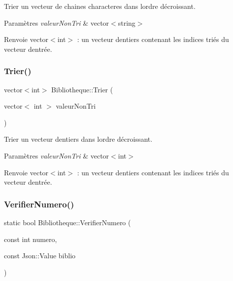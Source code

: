 Trier un vecteur de chaines characteres dans l\textquotesingle{}ordre décroissant. 


\begin{DoxyParams}{Paramètres}
{\em valeur\+Non\+Tri} & vector$<$string$>$ \\
\hline
\end{DoxyParams}
\begin{DoxyReturn}{Renvoie}
vector$<$int$>$ \+: un vecteur d\textquotesingle{}entiers contenant les indices triés du vecteur d\textquotesingle{}entrée. 
\end{DoxyReturn}
\mbox{\label{classBibliotheque_a0a0c1d628bfa840f764d4ec483f4b1e6}} 
\subsubsection{\texorpdfstring{Trier()}{Trier()}\hspace{0.1cm}{\footnotesize\ttfamily [4/4]}}
{\footnotesize\ttfamily vector$<$int$>$ Bibliotheque\+::\+Trier (\begin{DoxyParamCaption}\item[{vector$<$ int $>$}]{valeur\+Non\+Tri }\end{DoxyParamCaption})}



Trier un vecteur d\textquotesingle{}entiers dans l\textquotesingle{}ordre décroissant. 


\begin{DoxyParams}{Paramètres}
{\em valeur\+Non\+Tri} & vector$<$int$>$ \\
\hline
\end{DoxyParams}
\begin{DoxyReturn}{Renvoie}
vector$<$int$>$ \+: un vecteur d\textquotesingle{}entiers contenant les indices triés du vecteur d\textquotesingle{}entrée. 
\end{DoxyReturn}
\mbox{\label{classBibliotheque_a66606b7018ddd339af2a608ea4e6de9c}} 
\subsubsection{\texorpdfstring{Verifier\+Numero()}{VerifierNumero()}}
{\footnotesize\ttfamily static bool Bibliotheque\+::\+Verifier\+Numero (\begin{DoxyParamCaption}\item[{const int}]{numero,  }\item[{const Json\+::\+Value}]{biblio }\end{DoxyParamCaption})\hspace{0.3cm}{\ttfamily [static]}}



